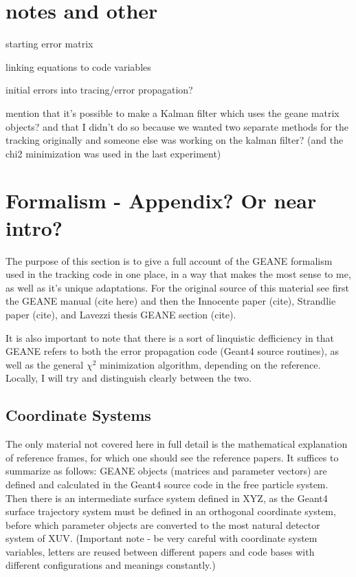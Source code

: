 \documentclass{article}
\begin{document}
\section{notes and other}

  starting error matrix

  linking equations to code variables

  initial errors into tracing/error propagation?

  mention that it's possible to make a Kalman filter which uses the geane matrix objects? and that I didn't do so because we wanted two separate methods for the tracking originally and someone else was working on the kalman filter? (and the chi2 minimization was used in the last experiment)


\section{Formalism - Appendix? Or near intro?}


The purpose of this section is to give a full account of the GEANE formalism used in the tracking code in one place, in a way that makes the most sense to me, as well as it's unique adaptations. For the original source of this material see first the GEANE manual (cite here) and then the Innocente paper (cite), Strandlie paper (cite), and Lavezzi thesis GEANE section (cite). 

It is also important to note that there is a sort of linquistic defficiency in that GEANE refers to both the error propagation code (Geant4 source routines), as well as the general $\chi^{2}$ minimization algorithm, depending on the reference. Locally, I will try and distinguish clearly between the two.


\subsection{Coordinate Systems}

The only material not covered here in full detail is the mathematical explanation of reference frames, for which one should see the reference papers. It suffices to summarize as follows: GEANE objects (matrices and parameter vectors) are defined and calculated in the Geant4 source code in the free particle system. Then there is an intermediate surface system defined in XYZ, as the Geant4 surface trajectory system must be defined in an orthogonal coordinate system, before which parameter objects are converted to the most natural detector system of XUV. (Important note - be very careful with coordinate system variables, letters are reused between different papers and code bases with different configurations and meanings constantly.)
\end{document}
